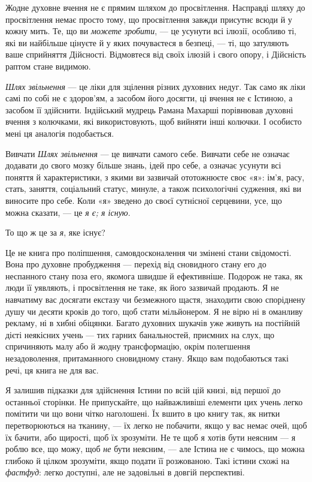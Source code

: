 Жодне духовне вчення не є прямим шляхом до просвітлення. Насправді шляху до просвітлення немає просто тому, що просвітлення завжди присутнє всюди й у кожну мить. Те, що ви \emph{можете зробити}, — це усунути всі ілюзії, особливо ті, які ви найбільше цінуєте й у яких почуваєтеся в безпеці, — ті, що затуляють ваше сприйняття Дійсності. Відмовтеся від своїх ілюзій і свого опору, і Дійсність раптом стане видимою.

\emph{Шлях звільнення} — це ліки для зцілення різних духовних недуг. Так само як ліки самі по собі не є здоров'ям, а засобом його досягти, ці вчення не є Істиною, а засобом її здійснити. Індійський мудрець Рамана Махарші порівнював духовні вчення з колючками, які використовують, щоб вийняти інші колючки. І особисто мені ця аналогія подобається.

Вивчати \emph{Шлях звільнення} — це вивчати самого себе. Вивчати себе не означає додавати до свого мозку більше знань, ідей про себе, а означає усунути всі поняття й характеристики, з якими ви зазвичай ототожнюєте своє «я»: ім'я, расу, стать, заняття, соціальний статус, минуле, а також психологічні судження, які ви виносите про себе. Коли «я» зведено до своєї сутнісної серцевини, усе, що можна сказати, — це \emph{я є; я існую}.

То що ж це за \emph{я}, яке існує?

Це не книга про поліпшення, самовдосконалення чи змінені стани свідомості. Вона про духовне пробудження — перехід від сновидного стану его до неспанного стану поза его, якомога швидше й ефективніше. Подорож не така, як люди її уявляють, і просвітлення не таке, як його зазвичай продають. Я не навчатиму вас досягати екстазу чи безмежного щастя, знаходити свою споріднену душу чи десяти кроків до того, щоб стати мільйонером. Я не вірю ні в оманливу рекламу, ні в хибні обіцянки. Багато духовних шукачів уже живуть на постійній дієті неякісних учень — тих гарних банальностей, приємних на слух, що спричиняють малу або й жодну трансформацію, окрім полегшення незадоволення, притаманного сновидному стану. Якщо вам подобаються такі речі, ця книга не для вас.

Я залишив підказки для здійснення Істини по всій цій книзі, від першої до останньої сторінки. Не припускайте, що найважливіші елементи цих учень легко помітити чи що вони чітко наголошені. Їх вшито в цю книгу так, як нитки перетворюються на тканину, — їх легко не побачити, якщо у вас немає очей, щоб їх бачити, або щирості, щоб їх зрозуміти. Не те щоб я хотів бути неясним --- я роблю все, що можу, щоб \emph{не} бути неясним, --- але Істина не є чимось, що можна глибоко й цілком зрозуміти, якщо подати її розжованою. Такі істини схожі на \emph{фастфуд}: легко доступні, але не задовільні в довгій перспективі.

